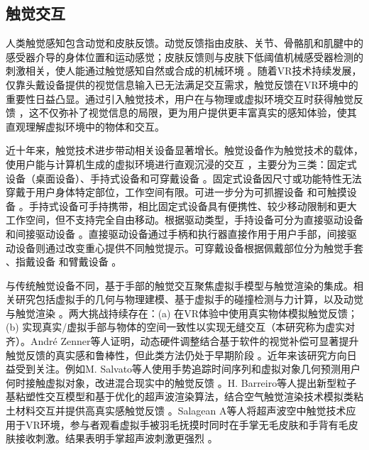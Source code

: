 \documentclass[runningheads]{llncs}
\begin{document}
\subsection{触觉交互}
人类触觉感知包含动觉和皮肤反馈。动觉反馈指由皮肤、关节、骨骼肌和肌腱中的感受器介导的身体位置和运动感觉；皮肤反馈则与皮肤下低阈值机械感受器检测的刺激相关，使人能通过触觉感知自然或合成的机械环境 \cite{hayward2004haptic}。随着VR技术持续发展，仅靠头戴设备提供的视觉信息输入已无法满足交互需求，触觉反馈在VR环境中的重要性日益凸显。通过引入触觉技术，用户在与物理或虚拟环境交互时获得触觉反馈 \cite{sreelakshmi2017haptic}，这不仅弥补了视觉信息的局限，更为用户提供更丰富真实的感知体验，使其直观理解虚拟环境中的物体和交互。

近十年来，触觉技术进步带动相关设备显著增长。触觉设备作为触觉技术的载体，使用户能与计算机生成的虚拟环境进行直观沉浸的交互 \cite{sreelakshmi2017haptic}，主要分为三类：固定式设备（桌面设备）、手持式设备和可穿戴设备 \cite{adilkhanov2022haptic}。固定式设备因尺寸或功能特性无法穿戴于用户身体特定部位，工作空间有限。可进一步分为可抓握设备 \cite{adel2018rendering,zarate2020contact,feick2023voxelhap} 和可触摸设备 \cite{adilkhanov2020vibero,goetz2020patch}。手持式设备可手持携带，相比固定式设备具有便携性、较少移动限制和更大工作空间，但不支持完全自由移动。根据驱动类型，手持设备可分为直接驱动设备 \cite{sakr2020haptic,chen2019haptivec} 和间接驱动设备 \cite{kovacs2020haptic}。直接驱动设备通过手柄和执行器直接作用于用户手部，间接驱动设备则通过改变重心提供不同触觉提示。可穿戴设备根据佩戴部位分为触觉手套 \cite{ozioko2022smart}、指戴设备 \cite{chinello2019modular,preechayasomboon2021haplets} 和臂戴设备 \cite{zhao2020wearable,pezent2022explorations}。

与传统触觉设备不同，基于手部的触觉交互聚焦虚拟手模型与触觉渲染的集成。相关研究包括虚拟手的几何与物理建模、基于虚拟手的碰撞检测与力计算，以及动觉与触觉渲染 \cite{tong2023survey}。两大挑战持续存在：(a) 在VR体验中使用真实物体模拟触觉反馈；(b) 实现真实/虚拟手部与物体的空间一致性以实现无缝交互（本研究称为虚实对齐）。André Zenner等人证明，动态硬件调整结合基于软件的视觉补偿可显著提升触觉反馈的真实感和鲁棒性，但此类方法仍处于早期阶段 \cite{zenner2021combining}。近年来该研究方向日益受到关注。例如M. Salvato等人使用手势追踪时间序列和虚拟对象几何预测用户何时接触虚拟对象，改进混合现实中的触觉反馈 \cite{salvato2022predicting}。H. Barreiro等人提出新型粒子基粘塑性交互模型和基于优化的超声波渲染算法，结合空气触觉渲染技术模拟类粘土材料交互并提供高真实感触觉反馈 \cite{barreiro2021natural}。Salagean A等人将超声波空中触觉技术应用于VR环境，参与者观看虚拟手被羽毛抚摸时同时在手掌无毛皮肤和手背有毛皮肤接收刺激。结果表明手掌超声波刺激更强烈 \cite{salagean2022virtual}。
\end{document}
